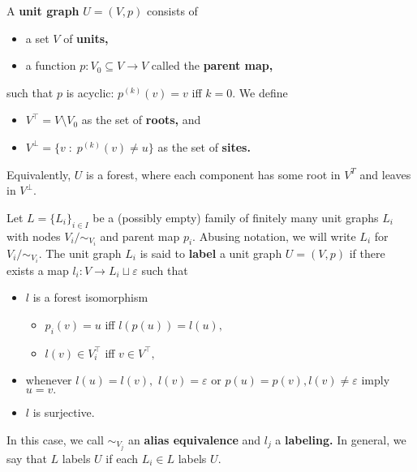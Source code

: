 \begin{definition}
  A \textbf{unit graph} $U = (V, p)$ consists of
  \begin{itemize}
    \item a set $V$ of \textbf{units,}
    \item a function $p: V_{0} \subseteq V \to V$ called the \textbf{parent map,}
  \end{itemize}
  such that $p$ is acyclic: $p^{(k)}(v) = v$ iff $k = 0$. We define
  \begin{itemize}
  \item $V^{\top} = V \setminus V_{0}$ as the set of \textbf{roots,} and
  \item $V^{\bot} = \{v \;:\; p^{(k)}(v) \neq u \}$ as the set of \textbf{sites.}
  \end{itemize}
  Equivalently, $U$ is a forest, where each component has some root in $V^{T}$ and leaves in $V^{\bot}.$

  Let $L = \{L_{i}\}_{i \in I}$ be a (possibly empty) family of finitely many unit graphs $L_{i}$ with nodes $V_{i} / \sim_{V_{i}}$ and parent map $p_{i}.$ Abusing notation, we will write $L_{i}$ for $V_{i} / \sim_{V_{i}}.$ The unit graph $L_{i}$ is said to \textbf{label} a unit graph $U = (V, p)$
  if there exists a map $l_{i}: V \to L_{i} \sqcup \varepsilon$ such that
  \begin{itemize}
    \item $l$ is a forest isomorphism
    \begin{itemize}
      \item $p_{i}(v) = u$ iff $l(p(u)) = l(u),$
      \item $l(v) \in V^{\top}_{i}$ iff $v \in V^{\top},$
    \end{itemize}
    \item whenever $l(u) = l(v),$ $l(v) = \varepsilon$ or $p(u) = p(v), l(v) \neq \varepsilon$ imply $u = v.$
    \item $l$ is surjective.
  \end{itemize}
  In this case, we call $\sim_{V_{j}}$ an \textbf{alias equivalence} and $l_{j}$ a \textbf{labeling.} In general, we say that $L$ labels $U$ if each $L_{i} \in L$ labels $U$.

\end{definition}

